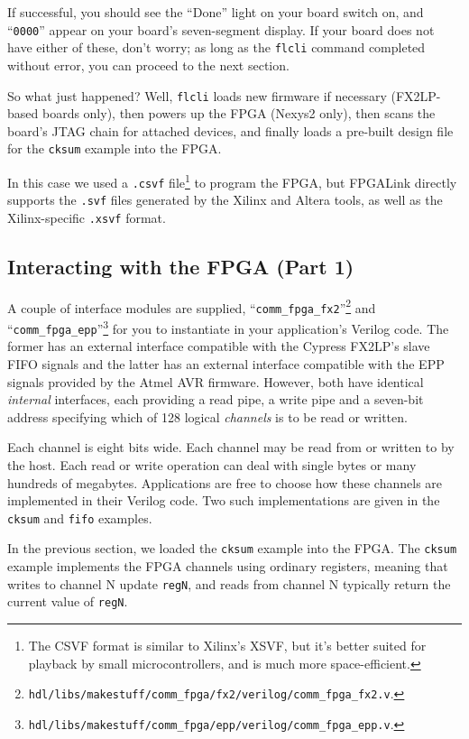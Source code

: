 If successful, you should see the ``Done'' light on your board switch on, and ``\texttt{0000}'' appear on your board's seven-segment display. If your board does not have either of these, don't worry; as long as the \texttt{flcli} command completed without error, you can proceed to the next section.

So what just happened? Well, \texttt{flcli} loads new firmware if necessary (FX2LP-based boards only), then powers up the FPGA (Nexys2 only), then scans the board's JTAG chain for attached devices, and finally loads a pre-built design file for the \texttt{cksum} example into the FPGA.

In this case we used a \texttt{.csvf} file\footnote{The CSVF format is similar to Xilinx's XSVF, but it's better suited for playback by small microcontrollers, and is much more space-efficient.} to program the FPGA, but FPGALink directly supports the \texttt{.svf} files generated by the Xilinx and Altera tools, as well as the Xilinx-specific \texttt{.xsvf} format.

\newpage
\subsection{Interacting with the FPGA (Part 1)}
A couple of interface modules are supplied, ``\texttt{comm\_fpga\_fx2}''\footnote{\texttt{hdl/libs/makestuff/comm\_fpga/fx2/verilog/comm\_fpga\_fx2.v}.} and ``\texttt{comm\_fpga\_epp}''\footnote{\texttt{hdl/libs/makestuff/comm\_fpga/epp/verilog/comm\_fpga\_epp.v}.} for you to instantiate in your application's Verilog code. The former has an external interface compatible with the Cypress FX2LP's slave FIFO signals and the latter has an external interface compatible with the EPP signals provided by the Atmel AVR firmware. However, both have identical \textit{internal} interfaces, each providing a read pipe, a write pipe and a seven-bit address specifying which of 128 logical \textit{channels} is to be read or written.


Each channel is eight bits wide. Each channel may be read from or written to by the host. Each read or write operation can deal with single bytes or many hundreds of megabytes. Applications are free to choose how these channels are implemented in their Verilog code. Two such implementations are given in the \texttt{cksum} and \texttt{fifo} examples.

In the previous section, we loaded the \texttt{cksum} example into the FPGA. The \texttt{cksum} example implements the FPGA channels using ordinary registers, meaning that writes to channel N update \texttt{regN}, and reads from channel N typically return the current value of \texttt{regN}.

